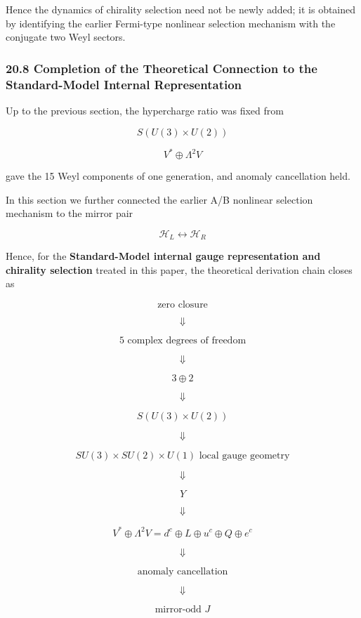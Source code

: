 \documentclass[
  a4paper,
]{article}
\begin{document}
Hence the dynamics of chirality selection need not be newly added; it is
obtained by identifying the earlier Fermi-type nonlinear selection
mechanism with the conjugate two Weyl sectors.

\subsubsection{20.8 Completion of the Theoretical Connection to the
Standard-Model Internal
Representation}\label{completion-of-the-theoretical-connection-to-the-standard-model-internal-representation}

Up to the previous section, the hypercharge ratio was fixed from

\[
S(U(3)\times U(2))
\]

\[
V^*\oplus\Lambda^2V
\]

gave the 15 Weyl components of one generation, and anomaly cancellation
held.

In this section we further connected the earlier A/B nonlinear selection
mechanism to the mirror pair

\[
\mathcal H_L
\leftrightarrow
\mathcal H_R
\]

Hence, for the \textbf{Standard-Model internal gauge representation and
chirality selection} treated in this paper, the theoretical derivation
chain closes as

\[
\boxed{
\text{zero closure}
}
\]

\[
\Downarrow
\]

\[
\boxed{
5\text{ complex degrees of freedom}
}
\]

\[
\Downarrow
\]

\[
\boxed{
3\oplus2
}
\]

\[
\Downarrow
\]

\[
\boxed{
S(U(3)\times U(2))
}
\]

\[
\Downarrow
\]

\[
\boxed{
SU(3)\times SU(2)\times U(1)
\text{ local gauge geometry}
}
\]

\[
\Downarrow
\]

\[
\boxed{
Y
}
\]

\[
\Downarrow
\]

\[
\boxed{
V^*\oplus\Lambda^2V
=
d^c\oplus L\oplus u^c\oplus Q\oplus e^c
}
\]

\[
\Downarrow
\]

\[
\boxed{
\text{anomaly cancellation}
}
\]

\[
\Downarrow
\]

\[
\boxed{
\text{mirror-odd }J
}
\]
\end{document}
